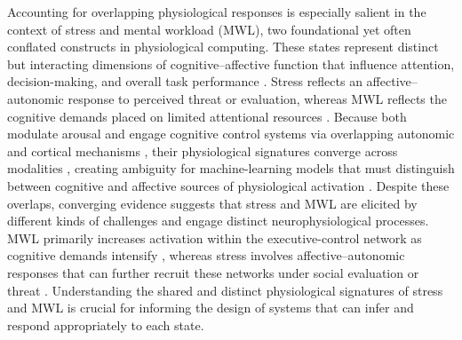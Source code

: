 \documentclass[lettersize,journal]{IEEEtran}
\begin{document}
Accounting for overlapping physiological responses is especially salient in the context of stress and mental workload (MWL), two foundational yet often conflated constructs in physiological computing. These states represent distinct but interacting dimensions of cognitive–affective function that influence attention, decision-making, and overall task performance \cite{faircloughFundamentalsPhysiologicalComputing2009, dehaisNeuroergonomicsApproachMental2020, alimardaniPassiveBrainComputerInterfaces2020, reimerImpactCognitiveWorkload2011}. Stress reflects an affective–autonomic response to perceived threat or evaluation, whereas MWL reflects the cognitive demands placed on limited attentional resources \cite{faircloughFundamentalsPhysiologicalComputing2009, alimardaniPassiveBrainComputerInterfaces2020, dehaisNeuroergonomicsApproachMental2020, reimerImpactCognitiveWorkload2011}. Because both modulate arousal and engage cognitive control systems via overlapping autonomic and cortical mechanisms \cite{mehlerPhysiologicalReactivityGraded2010, manMultisystemicEvaluationBiological2023, masiStressWorkloadAssessment2023}, their physiological signatures converge across modalities \cite{faircloughFundamentalsPhysiologicalComputing2009}, creating ambiguity for machine-learning models that must distinguish between cognitive and affective sources of physiological activation \cite{parentDiagnosticityPsychophysiologicalSignatures2019, bagheriEEGbasedDetectionMental2020}. Despite these overlaps, converging evidence suggests that stress and MWL are elicited by different kinds of challenges and engage distinct neurophysiological processes. MWL primarily increases activation within the executive-control network as cognitive demands intensify \cite{dehaisNeuroergonomicsApproachMental2020}, whereas stress involves affective–autonomic responses \cite{giannakakisReviewPsychologicalStress2022} that can further recruit these networks under social evaluation or threat \cite{causseFacingSuccessfullyHigh2021}. Understanding the shared and distinct physiological signatures of stress and MWL is crucial for informing the design of systems that can infer and respond appropriately to each state.
\end{document}
